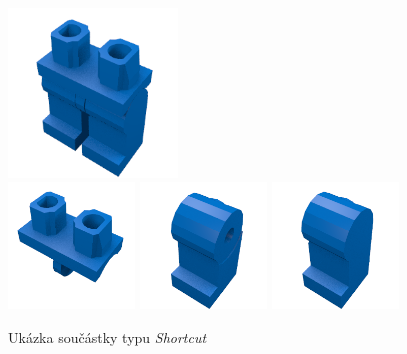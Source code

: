     \begin{figure}[htbp]
        \centering
        \includegraphics[width=0.4\textwidth,height=\textheight,keepaspectratio]{images/3815c01.png}
        \\
        \includegraphics[width=0.3\textwidth,height=\textheight,keepaspectratio]{images/3815.png}
        \includegraphics[width=0.3\textwidth,height=\textheight,keepaspectratio]{images/3816.png}
        \includegraphics[width=0.3\textwidth,height=\textheight,keepaspectratio]{images/3817.png}
        \caption{Ukázka součástky typu \textit{Shortcut} \autocite{rebrickable:part:image:970c00}\autocite{rebrickable:part:image:3815}\autocite{rebrickable:part:image:3816}\autocite{rebrickable:part:image:3817}\label{obrazek-ldraw-shortcut}}
    \end{figure}

